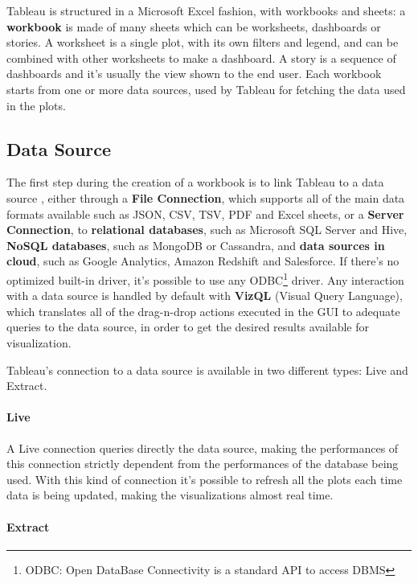 Tableau is structured in a Microsoft Excel fashion, with workbooks and sheets: a \textbf{workbook} is made of many sheets which can be worksheets, dashboards or stories. A worksheet is a single plot, with its own filters and legend, and can be combined with other worksheets to make a dashboard. A story is a sequence of dashboards and it's usually the view shown to the end user. Each workbook starts from one or more data sources, used by Tableau for fetching the data used in the plots.

\subsection{Data Source}

The first step during the creation of a workbook is to link Tableau to a data source \cite{LearningTableau}, either through a \textbf{File Connection}, which supports all of the main data formats available such as JSON, CSV, TSV, PDF and Excel sheets, or a \textbf{Server Connection}, to \textbf{relational databases}, such as Microsoft SQL Server and Hive, \textbf{NoSQL databases}, such as MongoDB or Cassandra, and \textbf{data sources in cloud}, such as Google Analytics, Amazon Redshift and Salesforce. If there's no optimized built-in driver, it's possible to use any ODBC\footnote{ODBC: Open DataBase Connectivity is a standard API to access DBMS} driver. Any interaction with a data source is handled by default with \textbf{VizQL} (Visual Query Language), which translates all of the drag-n-drop actions executed in the GUI to adequate queries to the data source, in order to get the desired results available for visualization.

Tableau's connection to a data source is available in two different types: Live and Extract.

\paragraph{Live}

A Live connection queries directly the data source, making the performances of this connection strictly dependent from the performances of the database being used. With this kind of connection it's possible to refresh all the plots each time data is being updated, making the visualizations almost real time.

\paragraph{Extract}

